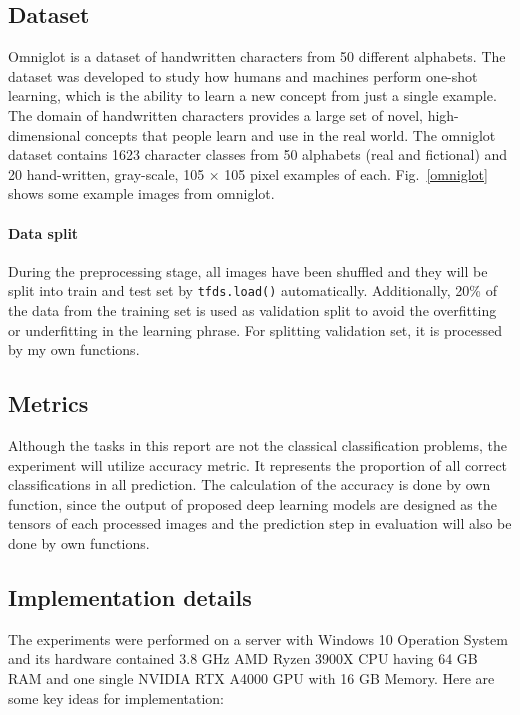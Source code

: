 \documentclass{article}
\begin{document}
\subsection{Dataset}

Omniglot is a dataset of handwritten characters from 50 different alphabets. The dataset was developed to study how humans and machines perform one-shot learning, which is the ability to learn a new concept from just a single example. The domain of handwritten characters provides a large set of novel, high-dimensional concepts that people learn and use in the real world. The omniglot dataset contains 1623 character classes from 50 alphabets (real and fictional) and 20 hand-written, gray-scale, 105 × 105 pixel examples of each. Fig.~\ref{omniglot} shows some example images from omniglot.

\paragraph{Data split} During the preprocessing stage, all images have been shuffled and they will be split into train and test set by \texttt{tfds.load()} automatically. Additionally, 20\% of the data from the training set is used as validation split to avoid the overfitting or underfitting in the learning phrase. For splitting validation set, it is processed by my own functions.

\subsection{Metrics}

Although the tasks in this report are not the classical classification problems, the experiment will utilize accuracy metric. It represents the proportion of all correct classifications in all prediction. The calculation of the accuracy is done by own function, since the output of proposed deep learning models are designed as the tensors of each processed images and the prediction step in evaluation will also be done by own functions.

\subsection{Implementation details}

The experiments were performed on a server with Windows 10 Operation System and its hardware contained 3.8 GHz AMD Ryzen 3900X CPU having 64 GB RAM and one single NVIDIA RTX A4000 GPU with 16 GB Memory. Here are some key ideas for implementation:
\end{document}
